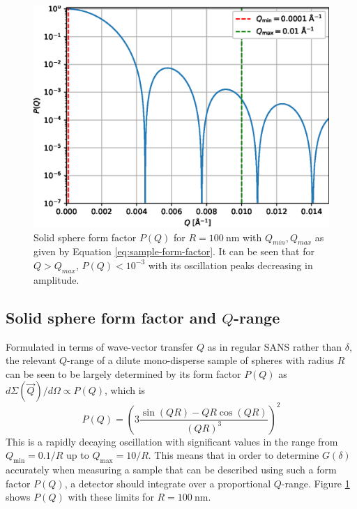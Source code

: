 \begin{figure}[h]
	\centering
	\includegraphics[width=0.5\linewidth]{analytical-P-log}
	\caption{Solid sphere form factor $P(Q)$ for $R = \SI{100}{\nano\meter}$ with $Q_{min}, Q_{max}$ as given by Equation \eqref{eq:sample-form-factor}. It can be seen that for $Q > Q_{max}$, $P(Q) < 10^{-3}$ with its oscillation peaks decreasing in amplitude.}
	\label{fig:analytical-P}
\end{figure}
\subsection{Solid sphere form factor and $Q$-range}
Formulated in terms of wave-vector transfer $Q$ as in regular SANS rather than $\delta$, the relevant $Q$-range of a dilute mono-disperse sample of spheres with radius $R$ can be seen to be largely determined by its form factor $P(Q)$ as $d\Sigma(\vec{Q})/d\Omega\propto P(Q)$, which is \cite{rekveldt1996}
\begin{equation}
	P(Q) = \left(3\frac{\sin(QR) - QR\cos(QR)}{\left(QR\right)^3}\right)^2\label{eq:sample-form-factor}
\end{equation}
This is a rapidly decaying oscillation with significant values in the range from $Q_{\text{min}} = 0.1/R$ up to $Q_{\text{max}} = 10/R$. This means that in order to determine $G(\delta)$ accurately when measuring a sample that can be described using such a form factor $P(Q)$, a detector should integrate over a proportional $Q$-range.  Figure \ref{fig:analytical-P} shows $P(Q)$ with these limits for $R = \SI{100}{\nano\meter}$.  
